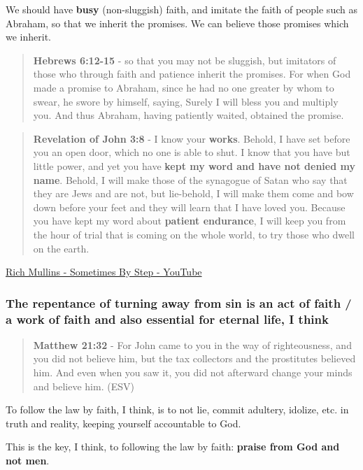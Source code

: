 \documentclass[11pt]{article}
\begin{document}
We should have \textbf{busy} (non-sluggish) faith,
and imitate the faith of people such as
Abraham, so that we inherit the promises.
We can believe those promises which we inherit.

\begin{quote}
\textbf{Hebrews 6:12-15} - so that you may not be sluggish, but imitators of those who through faith and patience inherit the promises. For when God made a promise to Abraham, since he had no one greater by whom to swear, he swore by himself, saying, Surely I will bless you and multiply you. And thus Abraham, having patiently waited, obtained the promise.
\end{quote}

\begin{quote}
\textbf{Revelation of John 3:8} - I know your \textbf{works}. Behold, I have set before you an open door, which no one is able to shut. I know that you have but little power, and yet you have \textbf{kept my word and have not denied my name}. Behold, I will make those of the synagogue of Satan who say that they are Jews and are not, but lie-behold, I will make them come and bow down before your feet and they will learn that I have loved you. Because you have kept my word about \textbf{patient endurance}, I will keep you from the hour of trial that is coming on the whole world, to try those who dwell on the earth.
\end{quote}

\href{https://www.youtube.com/watch?v=GamlYvhJyiM}{Rich Mullins - Sometimes By Step - YouTube}

\subsubsection{The repentance of turning away from sin is an act of faith / a work of faith and also essential for eternal life, I think}
\label{sec:org037b5ea}
\begin{quote}
\textbf{Matthew 21:32} - For John came to you in the way of righteousness, and you did not believe him, but the tax collectors and the prostitutes believed him. And even when you saw it, you did not afterward change your minds and believe him. (ESV)
\end{quote}

To follow the law by faith, I think, is to not lie, commit adultery, idolize, etc. in truth and reality, keeping yourself accountable to God.

This is the key, I think, to following the law by faith: \textbf{praise from God and not men}.
\end{document}
